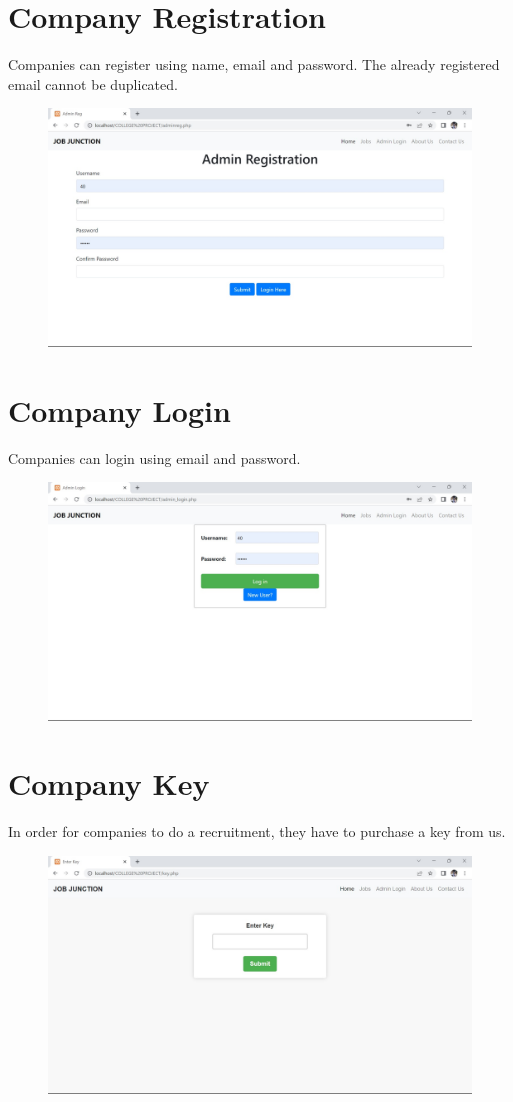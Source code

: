 \documentclass[a4paper,11pt]{report}
\begin{document}
\section{Company Registration}
Companies can register using name, email and password. The already registered email cannot be duplicated.
\begin{figure}[h]
	\centering
	\hspace{21pt}
	\includegraphics[width=.70\linewidth]{job1.jpeg}
	\label{fig:job1.jpeg}
\end{figure}

\section{Company Login}
Companies can login using email and password. 
\begin{figure}[h]
	\centering
	\hspace{21pt}
	\includegraphics[width=.70\linewidth]{job3.jpeg}
	\label{fig:job3.jpeg}
\end{figure}

\section{Company Key}
In order for companies to do a recruitment, they have to purchase a key from us.
\begin{figure}[h]
	\centering
	\hspace{21pt}
	\includegraphics[width=.70\linewidth]{job2.jpeg}
	\label{fig:job2.jpeg}
\end{figure}
\end{document}
